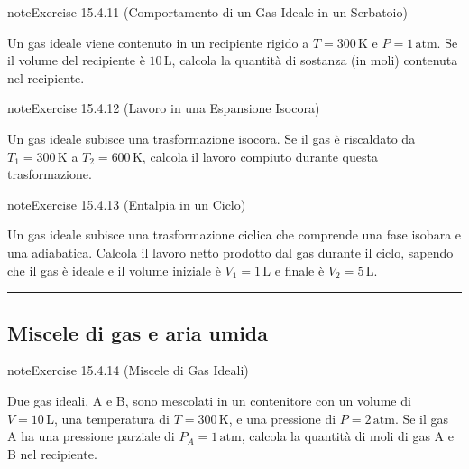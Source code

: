 \documentclass[letterpaper,10pt,italian]{jupyterBook}
\begin{document}
\begin{sphinxadmonition}{note}{Exercise 15.4.11 (Comportamento di un Gas Ideale in un Serbatoio)}



\sphinxAtStartPar
Un gas ideale viene contenuto in un recipiente rigido a \(T = 300 \, \text{K}\) e \(P = 1 \, \text{atm}\). Se il volume del recipiente è \(10 \, \text{L}\), calcola la quantità di sostanza (in moli) contenuta nel recipiente.
\end{sphinxadmonition}
 \label{exercise:ch/thermodynamics/matter-problems-exercise-11}

\begin{sphinxadmonition}{note}{Exercise 15.4.12 (Lavoro in una Espansione Isocora)}



\sphinxAtStartPar
Un gas ideale subisce una trasformazione isocora. Se il gas è riscaldato da \(T_1 = 300 \, \text{K}\) a \(T_2 = 600 \, \text{K}\), calcola il lavoro compiuto durante questa trasformazione.
\end{sphinxadmonition}
 \label{exercise:ch/thermodynamics/matter-problems-exercise-12}

\begin{sphinxadmonition}{note}{Exercise 15.4.13 (Entalpia in un Ciclo)}



\sphinxAtStartPar
Un gas ideale subisce una trasformazione ciclica che comprende una fase isobara e una adiabatica. Calcola il lavoro netto prodotto dal gas durante il ciclo, sapendo che il gas è ideale e il volume iniziale è \(V_1 = 1 \, \text{L}\) e finale è \(V_2 = 5 \, \text{L}\).
\end{sphinxadmonition}


\bigskip\hrule\bigskip



\subsection{Miscele di gas e aria umida}
\label{\detokenize{ch/thermodynamics/matter-problems:miscele-di-gas-e-aria-umida}} \label{exercise:ch/thermodynamics/matter-problems-exercise-13}

\begin{sphinxadmonition}{note}{Exercise 15.4.14 (Miscele di Gas Ideali)}



\sphinxAtStartPar
Due gas ideali, A e B, sono mescolati in un contenitore con un volume di \(V = 10 \, \text{L}\), una temperatura di \(T = 300 \, \text{K}\), e una pressione di \(P = 2 \, \text{atm}\). Se il gas A ha una pressione parziale di \(P_A = 1 \, \text{atm}\), calcola la quantità di moli di gas A e B nel recipiente.
\end{sphinxadmonition}
 \label{exercise:ch/thermodynamics/matter-problems-exercise-14}
\end{document}
